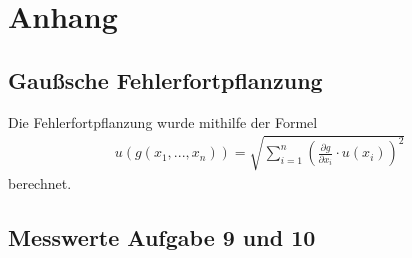 \documentclass[11pt, a4paper]{article}
\begin{document}
    \section{Anhang}
    \subsection{Gaußsche Fehlerfortpflanzung}
    Die Fehlerfortpflanzung wurde mithilfe der Formel
    \begin{align}
        u\left(g \left(x_1, ..., x_n\right)\right) = \sqrt{\sum_{i=1}^n \left( \frac{\partial g }{\partial x_i} \cdot u\left(x_i\right) \right)^2} \label{gauss}
    \end{align}
    berechnet.
    \subsection{Messwerte Aufgabe 9 und 10}
    

    
    
\end{document}
